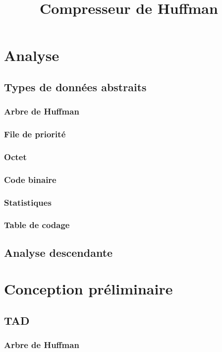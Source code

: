 \documentclass[12pt,a4paper]{article}
\title{Compresseur de Huffman}
\author{}
\date{}
\begin{document}
\maketitle

\tableofcontents

\section{Analyse}
\subsection{Types de données abstraits}
\subsubsection{Arbre de Huffman}

\subsubsection{File de priorité}

\subsubsection{Octet}

\subsubsection{Code binaire}

\subsubsection{Statistiques}

\subsubsection{Table de codage}

\subsection{Analyse descendante}

\section{Conception préliminaire}
\subsection{TAD}
\subsubsection{Arbre de Huffman}

\end{document}
